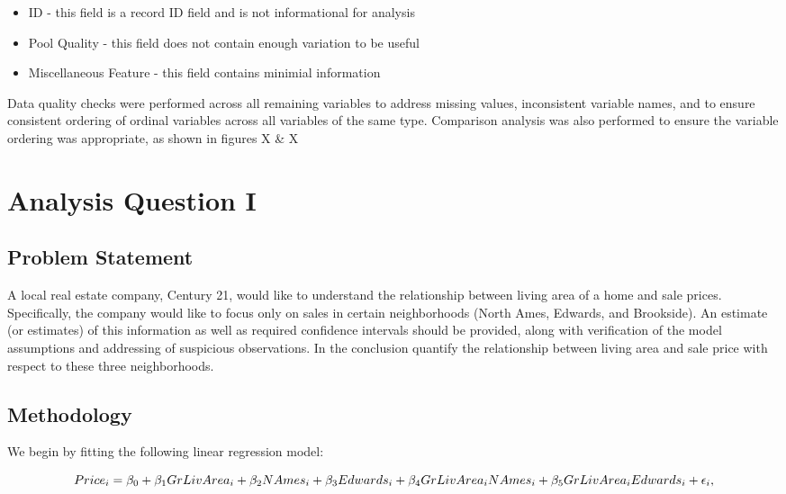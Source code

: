 \documentclass[american,]{article}
\providecommand{\tightlist}{%
  \setlength{\itemsep}{0pt}\setlength{\parskip}{0pt}}
\begin{document}
\begin{itemize}
\tightlist
\item
  ID - this field is a record ID field and is not informational for
  analysis
\item
  Pool Quality - this field does not contain enough variation to be
  useful
\item
  Miscellaneous Feature - this field contains minimial information
\end{itemize}

Data quality checks were performed across all remaining variables to
address missing values, inconsistent variable names, and to ensure
consistent ordering of ordinal variables across all variables of the
same type. Comparison analysis was also performed to ensure the variable
ordering was appropriate, as shown in figures X \& X

\section{Analysis Question I}\label{analysis-question-i}

\subsection{Problem Statement}\label{problem-statement}

A local real estate company, Century 21, would like to understand the
relationship between living area of a home and sale prices.
Specifically, the company would like to focus only on sales in certain
neighborhoods (North Ames, Edwards, and Brookside). An estimate (or
estimates) of this information as well as required confidence intervals
should be provided, along with verification of the model assumptions and
addressing of suspicious observations. In the conclusion quantify the
relationship between living area and sale price with respect to these
three neighborhoods.

\subsection{Methodology}\label{methodology}

We begin by fitting the following linear regression model:

\begin{equation}
Price_i = {\beta_0} + {\beta_1}GrLivArea_{i} + {\beta_2}NAmes_{i} + {\beta_3}Edwards_{i} + {\beta_4}GrLivArea_{i}\*NAmes_{i}
+ {\beta_5}GrLivArea_{i}\*Edwards_{i}
+ {\epsilon_i},
\end{equation}
\end{document}
